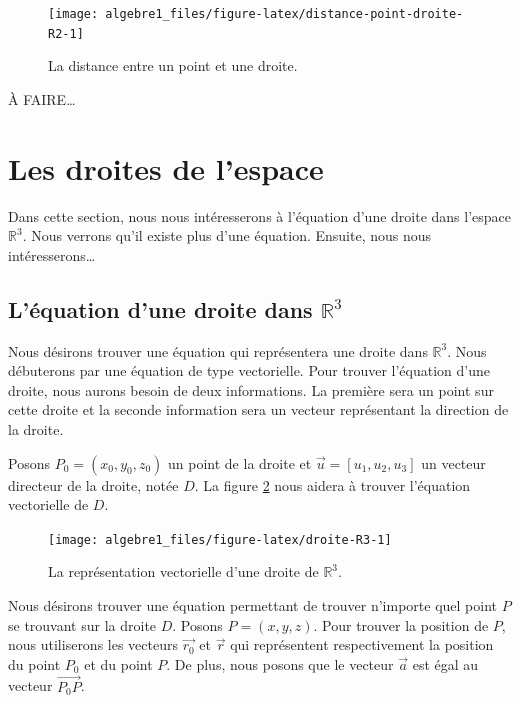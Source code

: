 \documentclass[]{book}
\theoremstyle{definition}
\theoremstyle{definition}
\theoremstyle{definition}
\theoremstyle{remark}
\begin{document}
\begin{figure}

{\centering \texttt{[image: algebre1\_files/figure-latex/distance-point-droite-R2-1]} 

}

\caption{La distance entre un point et une droite.}\label{fig:distance-point-droite-R2}
\end{figure}

À FAIRE\ldots{}

\hypertarget{les-droites-de-lespace}{%
\section{Les droites de l'espace}\label{les-droites-de-lespace}}

Dans cette section, nous nous intéresserons à l'équation d'une droite dans l'espace \(\mathbb{R}^3\). Nous verrons qu'il existe plus d'une équation. Ensuite, nous nous intéresserons\ldots{}

\hypertarget{luxe9quation-dune-droite-dans-mathbbr3}{%
\subsection{\texorpdfstring{L'équation d'une droite dans \(\mathbb{R}^3\)}{L'équation d'une droite dans \textbackslash{}mathbb\{R\}\^{}3}}\label{luxe9quation-dune-droite-dans-mathbbr3}}

Nous désirons trouver une équation qui représentera une droite dans \(\mathbb{R}^3\). Nous débuterons par une équation de type vectorielle. Pour trouver l'équation d'une droite, nous aurons besoin de deux informations. La première sera un point sur cette droite et la seconde information sera un vecteur représentant la direction de la droite.

Posons \(P_0=(x_0,y_0,z_0)\) un point de la droite et \(\overrightarrow{u}=[u_1,u_2,u_3]\) un vecteur directeur de la droite, notée \(D\). La figure \ref{fig:droite-R3} nous aidera à trouver l'équation vectorielle de \(D\).

\begin{figure}

{\centering \texttt{[image: algebre1\_files/figure-latex/droite-R3-1]} 

}

\caption{La représentation vectorielle d'une droite de $\mathbb{R}^3$.}\label{fig:droite-R3}
\end{figure}

Nous désirons trouver une équation permettant de trouver n'importe quel point \(P\) se trouvant sur la droite \(D\). Posons \(P=(x,y,z)\). Pour trouver la position de \(P\), nous utiliserons les vecteurs \(\overrightarrow{r_0}\) et \(\overrightarrow{r}\) qui représentent respectivement la position du point \(P_0\) et du point \(P\). De plus, nous posons que le vecteur \(\overrightarrow{a}\) est égal au vecteur \(\overrightarrow{P_0 P}\).
\end{document}
